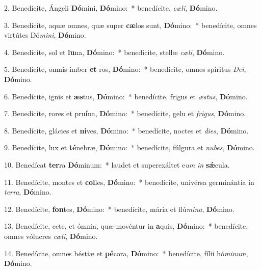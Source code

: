 
2. Benedícite, Ángeli \textbf{Dó}mini, \textbf{Dó}mino:~* benedícite, \textit{cæ}\textit{li}, \textbf{Dó}mino.

3. Benedícite, aquæ omnes, quæ super \textbf{cæ}los sunt, \textbf{Dó}mino:~* benedícite, omnes virtútes Dó\textit{mi}\textit{ni}, \textbf{Dó}mino.

4. Benedícite, sol et \textbf{lu}na, \textbf{Dó}mino:~* benedícite, stellæ \textit{cæ}\textit{li}, \textbf{Dó}mino.

5. Benedícite, omnis imber \textbf{et} ros, \textbf{Dó}mino:~* benedícite, omnes spíritus \textit{De}\textit{i}, \textbf{Dó}mino.

6. Benedícite, ignis et \textbf{æs}tus, \textbf{Dó}mino:~* benedícite, frigus et \textit{æs}\textit{tus}, \textbf{Dó}mino.

7. Benedícite, rores et pru\textbf{í}na, \textbf{Dó}mino:~* benedícite, gelu et \textit{fri}\textit{gus}, \textbf{Dó}mino.

8. Benedícite, glácies et \textbf{ni}ves, \textbf{Dó}mino:~* benedícite, noctes et \textit{di}\textit{es}, \textbf{Dó}mino.

9. Benedícite, lux et \textbf{té}nebræ, \textbf{Dó}mino:~* benedícite, fúlgura et \textit{nu}\textit{bes}, \textbf{Dó}mino.

10. Benedícat \textbf{ter}ra \textbf{Dó}minum:~* laudet et superexáltet e\textit{um} \textit{in} \textbf{s\'{\ae}}cula.

11. Benedícite, montes et \textbf{col}les, \textbf{Dó}mino:~* benedícite, univérsa germinántia in \textit{ter}\textit{ra}, \textbf{Dó}mino.

12. Benedícite, \textbf{fon}tes, \textbf{Dó}mino:~* benedícite, mária et flú\textit{mi}\textit{na}, \textbf{Dó}mino.

13. Benedícite, cete, et ómnia, quæ movéntur in \textbf{a}quis, \textbf{Dó}mino:~* benedícite, omnes vólucres \textit{cæ}\textit{li}, \textbf{Dó}mino.

14. Benedícite, omnes béstiæ et \textbf{pé}cora, \textbf{Dó}mino:~* benedícite, fílii hó\textit{mi}\textit{num}, \textbf{Dó}mino.

